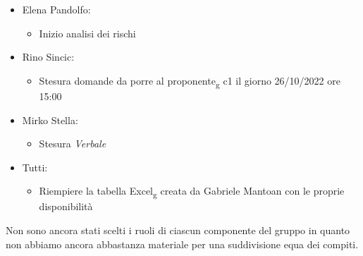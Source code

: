 \begin{itemize}
\begin{itemize}
    \end{itemize}
    \item Elena Pandolfo:
    \begin{itemize}
        \item Inizio analisi dei rischi
    \end{itemize}
    \item Rino Sincic:
    \begin{itemize}
        \item Stesura domande da porre al proponente\textsubscript{g} c1 il giorno 26/10/2022 ore 15:00
    \end{itemize}
    \item Mirko Stella:
    \begin{itemize}
        \item Stesura \textit{Verbale}
    \end{itemize}
    \item Tutti: 
    \begin{itemize}
        \item Riempiere la tabella Excel\textsubscript{g} creata da Gabriele Mantoan con le proprie disponibilità
    \end{itemize}
\end{itemize}
Non sono ancora stati scelti i ruoli di ciascun componente del gruppo in quanto non abbiamo ancora abbastanza materiale per
una suddivisione equa dei compiti.